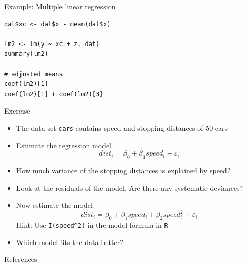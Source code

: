 \documentclass[aspectratio=169]{beamer}
\begin{document}
\begin{frame}[fragile]{Example: Multiple linear regression}
\begin{lstlisting}
dat$xc <- dat$x - mean(dat$x)

lm2 <- lm(y ~ xc + z, dat)
summary(lm2)

# adjusted means
coef(lm2)[1]
coef(lm2)[1] + coef(lm2)[3]
\end{lstlisting}
\end{frame}

\begin{frame}[fragile]{}
  \begin{block}{Exercise}
    \begin{itemize}
      \item The data set \texttt{cars} contains speed and stopping
        distances of 50 cars
      \item Estimate the regression model
\[
  dist_i = \beta_0 + \beta_1 speed_i + \varepsilon_i
\]\vspace{-.8cm}
      \item How much variance of the stopping distances is explained by
      speed? \item Look at the residuals of the model. Are there any
        systematic deviances?
      \item Now estimate the model
\[
  dist_i = \beta_0 + \beta_1 speed_i + \beta_2 speed^2_i + \varepsilon_i
\]
        Hint: Use \verb+I(speed^2)+ in the model formula in \texttt{R}
      \item Which model fits the data better?
    \end{itemize}
  \end{block}
\end{frame}


\appendix

\begin{frame}{References}
  \printbibliography
  \vfill
\end{frame}
\end{document}
